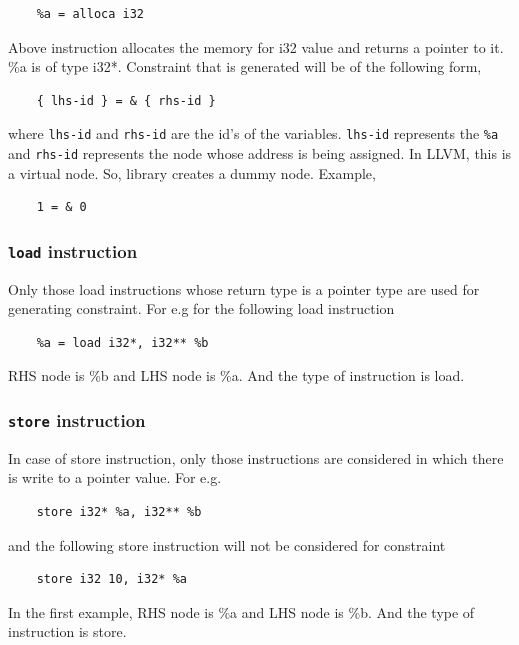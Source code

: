 \documentclass[a4paper,12pt]{report}
\begin{document}
\begin{lstlisting}
    %a = alloca i32
\end{lstlisting}
\noindent
Above instruction allocates the memory for i32 value and returns a pointer to 
it. \%a is of type i32*. Constraint that is generated will be of the following 
form,

\begin{lstlisting}
    { lhs-id } = & { rhs-id }
\end{lstlisting}
\noindent
where \texttt{lhs-id} and \texttt{rhs-id} are the id's of the variables. 
\texttt{lhs-id} represents the \texttt{\%a} and \texttt{rhs-id} represents the 
node whose address is being assigned. In LLVM, this is a virtual node. So, 
library creates a dummy node.
Example,

\begin{lstlisting}
    1 = & 0
\end{lstlisting}


\subsubsection{\texttt{load} instruction}
Only those load instructions whose return type is a pointer type are used for
generating constraint. For e.g for the following load instruction

\begin{lstlisting}
    %a = load i32*, i32** %b
\end{lstlisting}

\noindent
RHS node is \%b and LHS node is \%a. And the type of instruction is load.

\subsubsection{\texttt{store} instruction}
In case of store instruction, only those instructions are considered in which
there is write to a pointer value. For e.g.

\begin{lstlisting}
    store i32* %a, i32** %b
\end{lstlisting}
\noindent
and the following store instruction will not be considered for constraint

\begin{lstlisting}
    store i32 10, i32* %a
\end{lstlisting}

In the first example, RHS node is \%a and LHS node is \%b. And the type of 
instruction is store.
\end{document}

